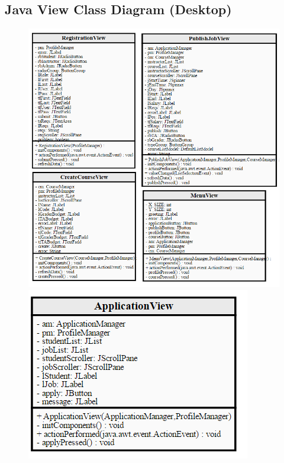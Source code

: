 \documentclass[12pt]{article}
\begin{document}
\subsection{Java View Class Diagram (Desktop)}
\begin{figure}[H]
	\centering
	\includegraphics[scale=1]{./ClassDiagrams/desktopViewPackageDiagram(A).png}
	\includegraphics[scale=1]{./ClassDiagrams/desktopViewPackageDiagram(B).png}
\end{figure}
\end{document}

